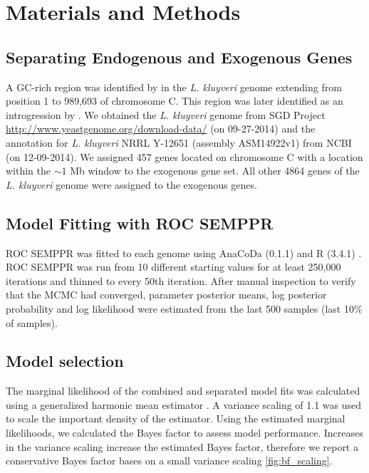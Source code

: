 \documentclass{bmcart}
\newcommand{\kluyveri}{\textit{L. kluyveri}\xspace}
\newcommand{\ROC}{ROC SEMPPR\xspace}
\begin{document}
\section*{Materials and Methods}

\subsection*{Separating Endogenous and Exogenous Genes}
A GC-rich region was identified by \cite{payen2009} in the \kluyveri genome extending from position 1 to 989,693 of chromosome C.
This region was later identified as an introgression by \cite{friedrich2015}.
We obtained the \kluyveri genome from SGD Project \url{http://www.yeastgenome.org/download-data/} (on 09-27-2014) and the annotation for \kluyveri NRRL Y-12651 (assembly ASM14922v1) from NCBI (on 12-09-2014).
We assigned 457 genes located on chromosome C with a location within the $\sim 1$ Mb window to the exogenous gene set.
All other 4864 genes of the \kluyveri genome were assigned to the exogenous genes.

\subsection*{Model Fitting with \ROC}
\ROC was fitted to each genome using AnaCoDa (0.1.1) \citep{landerer2018} and R (3.4.1) \citep{rcore}.
\ROC was run from 10 different starting values for at least 250,000 iterations and thinned to every 50th iteration.
After manual inspection to verify that the MCMC had converged, parameter posterior means, log posterior probability and log likelihood were estimated from the last 500 samples (last 10\% of samples).

\subsection*{Model selection}
The marginal likelihood of the combined and separated model fits was calculated using a generalized harmonic mean estimator \citep{Gronau2017}. A variance scaling of 1.1 was used to scale the important density of the estimator. Using the estimated marginal likelihoods, we calculated the Bayes factor to assess model performance. 
Increases in the variance scaling increase the estimated Bayes factor, therefore we report a conservative Bayes factor bases on a small variance scaling \ref{fig:bf_scaling}.
\end{document}

